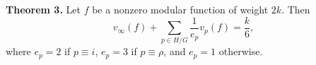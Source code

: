 \textbf{Theorem 3.} Let $f$ be a nonzero modular function of weight $2k$. Then
$$v_\infty(f) + \sum_{p \in H/G} \frac{1}{e_p} v_p(f) = \frac{k}{6},$$
where $e_p = 2$ if $p \equiv i$, $e_p = 3$ if $p \equiv \rho$, and $e_p = 1$ otherwise.
